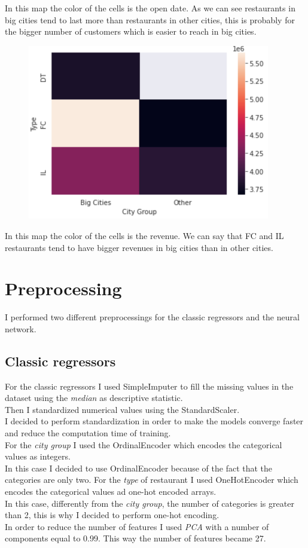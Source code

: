 \documentclass[a4paper,10pt]{report}
\begin{document}
In this map the color of the cells is the open date. As we can see restaurants in big cities tend to last more than restaurants in other cities, this is probably for the bigger number of customers which is easier to reach in big cities.
\begin{figure}[H]
    \centering
    \includegraphics[width = 300pt]{img/revenuecitygrouppivot.png}
  \end{figure}
  In this map the color of the cells is the revenue. We can say that FC and IL restaurants tend to have bigger revenues in big cities than in other cities.
\section{Preprocessing}
I performed two different preprocessings for the classic regressors and the neural network.\\
\subsection{Classic regressors}
For the classic regressors I used {\selectfont
SimpleImputer} to fill the missing values in the dataset using the \emph{median} as descriptive statistic.\\
Then I standardized numerical values using the {\selectfont StandardScaler}.\\
I decided to perform standardization in order to make the models converge faster and reduce the computation time of training.\\
For the \emph{city group} I used the {\selectfont OrdinalEncoder} which encodes the categorical values as integers.\\
In this case I decided to use {\selectfont OrdinalEncoder} because of the fact that the categories are only two.
For the \emph{type} of restaurant I used {\selectfont OneHotEncoder} which encodes the categorical values ad one-hot encoded arrays.\\
In this case, differently from the \emph{city group}, the number of categories is greater than 2, this is why I decided to perform one-hot encoding.\\
In order to reduce the number of features I used \emph{PCA} with a number of components equal to 0.99.
This way the number of features became 27.
\end{document}
